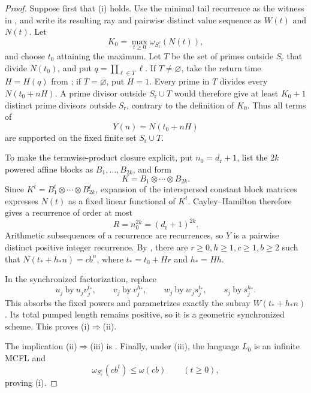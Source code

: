 \begin{proof}
  Suppose first that \textup{(i)} holds. Use the minimal tail recurrence
  as the witness in
  , and write its resulting
  ray and pairwise distinct value sequence as \(W(t)\) and \(N(t)\).
  Let
  \[
    K_0=\max_{t\ge0}\omega_{S_{\mathrm r}^c}(N(t)),
  \]
  and choose \(t_0\) attaining the maximum. Let \(T\) be the set of
  primes outside \(S_{\mathrm r}\) that divide \(N(t_0)\), and put
  \(q=\prod_{\ell\in T}\ell\). If \(T\ne\varnothing\), take the return
  time \(H=H(q)\) from
  ; if \(T=\varnothing\),
  put \(H=1\). Every prime in \(T\) divides every \(N(t_0+nH)\). A prime
  divisor outside \(S_{\mathrm r}\cup T\) would therefore give at least
  \(K_0+1\) distinct prime divisors outside \(S_{\mathrm r}\), contrary
  to the definition of \(K_0\). Thus all terms of
  \[
    Y(n)=N(t_0+nH)
  \]
  are supported on the fixed finite set \(S_{\mathrm r}\cup T\).

  To make the termwise-product closure explicit, put
  \(n_0=d_{\mathrm r}+1\), list the \(2k\) powered affine blocks as
  \(B_1,\ldots,B_{2k}\), and form
  \[
    K=B_1\otimes\cdots\otimes B_{2k}.
  \]
  Since \(K^t=B_1^t\otimes\cdots\otimes B_{2k}^t\), expansion of the
  interspersed constant block matrices expresses \(N(t)\) as a fixed
  linear functional of \(K^t\). Cayley--Hamilton therefore gives a
  recurrence of order at most
  \[
    R=n_0^{2k}=(d_{\mathrm r}+1)^{2k}.
  \]
  Arithmetic subsequences of a recurrence are recurrences, so \(Y\) is a
  pairwise distinct positive integer recurrence. By
  , there are
  \(r\ge0,h\ge1,c\ge1,b\ge2\) such that
  \(N(t_\ast+h_\ast n)=cb^n\), where
  \(t_\ast=t_0+Hr\) and \(h_\ast=Hh\).

  In the synchronized factorization, replace
  \[
    u_j\ \text{by}\ u_jv_j^{t_\ast},\qquad
    v_j\ \text{by}\ v_j^{h_\ast},\qquad
    w_j\ \text{by}\ w_js_j^{t_\ast},\qquad
    s_j\ \text{by}\ s_j^{h_\ast}.
  \]
  This absorbs the fixed powers and parametrizes exactly the subray
  \(W(t_\ast+h_\ast n)\). Its total pumped length remains positive, so
  it is a geometric synchronized scheme. This proves
  \textup{(i)}\(\Rightarrow\)\textup{(ii)}.

  The implication \textup{(ii)}\(\Rightarrow\)\textup{(iii)} is
  . Finally, under
  \textup{(iii)}, the language \(L_0\) is an infinite MCFL and
  \[
    \omega_{S_{\mathrm r}^c}(cb^t)\le\omega(cb)
    \qquad(t\ge0),
  \]
  proving \textup{(i)}.
\end{proof}

